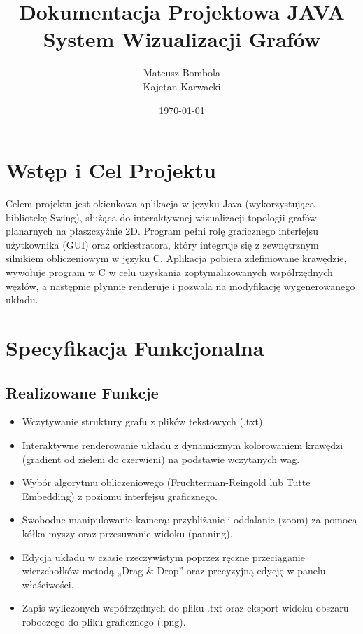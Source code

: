\documentclass[12pt, a4paper]{article}
\title{\vspace*{3cm} \textbf{Dokumentacja Projektowa JAVA \\ System Wizualizacji Grafów}}
\author{Mateusz Bombola \\ Kajetan Karwacki}
\date{\today}
\begin{document}
\maketitle
\thispagestyle{empty}

\newpage
\tableofcontents
\newpage

\section{Wstęp i Cel Projektu}
Celem projektu jest okienkowa aplikacja w języku Java (wykorzystująca bibliotekę Swing), służąca do interaktywnej wizualizacji topologii grafów planarnych na płaszczyźnie 2D. Program pełni rolę graficznego interfejsu użytkownika (GUI) oraz orkiestratora, który integruje się z zewnętrznym silnikiem obliczeniowym w języku C. Aplikacja pobiera zdefiniowane krawędzie, wywołuje program w C w celu uzyskania zoptymalizowanych współrzędnych węzłów, a następnie płynnie renderuje i pozwala na modyfikację wygenerowanego układu.

\section{Specyfikacja Funkcjonalna}

\subsection{Realizowane Funkcje}
\begin{itemize}
    \item Wczytywanie struktury grafu z plików tekstowych (.txt).
    \item Interaktywne renderowanie układu z dynamicznym kolorowaniem krawędzi (gradient od zieleni do czerwieni) na podstawie wczytanych wag.
    \item Wybór algorytmu obliczeniowego (Fruchterman-Reingold lub Tutte Embedding) z poziomu interfejsu graficznego.
    \item Swobodne manipulowanie kamerą: przybliżanie i oddalanie (zoom) za pomocą kółka myszy oraz przesuwanie widoku (panning).
    \item Edycja układu w czasie rzeczywistym poprzez ręczne przeciąganie wierzchołków metodą „Drag \& Drop” oraz precyzyjną edycję w panelu właściwości.
    \item Zapis wyliczonych współrzędnych do pliku .txt oraz eksport widoku obszaru roboczego do pliku graficznego (.png).
\end{itemize}
\end{document}
